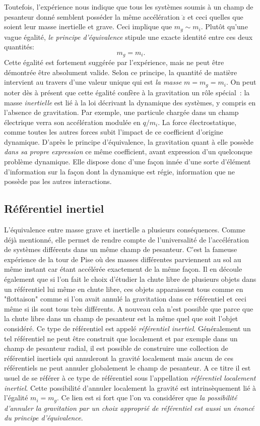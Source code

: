 Toutefois, l'expérience nous indique que tous les systèmes soumis à un champ de pesanteur donné semblent posséder la même accélération $\ddot z$ et ceci quelles que soient leur masse inertielle et grave. Ceci implique que $m_g\sim m_i$. Plutôt qu'une vague égalité, \textit{le principe d'équivalence} stipule une exacte identité entre ces deux quantités:
\begin{equation}
m_g=m_i.
\end{equation}
Cette égalité est fortement suggérée par l'expérience, mais ne peut être démontrée être absolument valide. Selon ce principe, la quantité de matière intervient au travers d'une valeur unique qui est \textit{la masse} $m=m_g=m_i$. On peut noter dès à présent que cette égalité confère à la gravitation un rôle spécial~: la masse \textit{inertielle} est lié à la loi décrivant la dynamique des systèmes, y compris en l'absence de gravitation. Par exemple, une particule chargée dans un champ électrique verra son accélération modulée en $q/m_i$. La force électrostatique, comme toutes les autres forces subit l'impact de ce coefficient d'origine dynamique. D'après le principe d'équivalence, la gravitation quant à elle possède \textit{dans sa propre expression} ce même coefficient, avant expression d'un quelconque problème dynamique. Elle dispose donc d'une façon innée d'une sorte d'élément d'information sur la façon dont la dynamique est régie, information que ne possède pas les autres interactions.

\subsection{Référentiel inertiel}
L'équivalence entre masse grave et inertielle a plusieurs conséquences. Comme déjà mentionné, elle permet de rendre compte de l'universalité de l'accélération de systèmes différents dans un même champ de pesanteur. C'est la fameuse expérience de la tour de Pise où des masses différentes parviennent au sol au même instant car étant accélérée exactement de la même façon. Il en découle également que si l'on fait le choix d'étudier la chute libre de plusieurs objets dans un référentiel lui même en chute libre, ces objets apparaissent tous comme en "flottaison" comme si l'on avait annulé la gravitation dans ce référentiel et ceci même si ils sont tous très différents. A nouveau cela n'est possible que parce que la chute libre dans un champ de pesanteur est la même quel que soit l'objet considéré. Ce type de référentiel est appelé \textit{référentiel inertiel}. Généralement un tel référentiel ne peut être construit que localement et par exemple dans un champ de pesanteur radial, il est possible de construire une collection de référentiel inertiels qui annuleront la gravité localement mais aucun de ces référentiels ne peut annuler globalement le champ de pesanteur. A ce titre il est usuel de se référer à ce type de référentiel sous l'appellation \textit{référentiel localement inertiel}. Cette possibilité d'annuler localement la gravité est intrinsèquement lié à l'égalité $m_i=m_g$. Ce lien est si fort que l'on va considérer que \textit{la possibilité d'annuler la gravitation par un choix approprié de référentiel est aussi un énoncé du principe d'équivalence}. 

